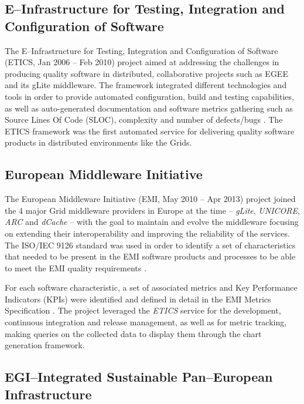 \documentclass[journal]{IEEEtran}
\begin{document}
\subsection{E--Infrastructure for Testing, Integration and Configuration of Software}

The E--Infrastructure for Testing, Integration and Configuration of Software
\cite{cordis:etics, cordis:etics2} (ETICS, Jan 2006 -- Feb 2010) project aimed
at addressing the challenges in producing quality software in distributed,
collaborative projects such as EGEE and its gLite middleware. The framework
integrated different technologies and tools in order to provide automated configuration,
build and testing capabilities, as well as auto-generated documentation and
software metrics gathering such as Source Lines Of Code (SLOC), complexity and
number of defects/bugs \cite{etics}. The ETICS framework was the first automated
service for delivering quality software products in distributed environments like
the Grids.



\subsection{European Middleware Initiative}

The European Middleware Initiative (EMI, May 2010 -- Apr 2013)
\cite{cordis:emi} project joined the 4 major Grid middleware providers in
Europe at the time -- {\sl gLite}, {\sl UNICORE}, {\sl ARC} and {\sl dCache} --
with the goal to maintain and evolve the middleware focusing on extending their
interoperability and improving the reliability of the services. The
ISO/IEC 9126 \cite{iso-9126} standard was used in order to identify a set of
characteristics that needed to be present in the EMI software products and
processes to be able to meet the EMI quality requirements
\cite{emi-quality-model}.

For each software characteristic, a set of associated
metrics and Key Performance Indicators (KPIs) were identified and defined in
detail in the EMI Metrics Specification \cite{emi-metrics}. The project
leveraged the {\sl ETICS} service for the development, continuous integration and release management,
as well as for metric tracking, making queries on the collected data to display
them through the chart generation framework.

\subsection{EGI--Integrated Sustainable Pan--European Infrastructure}
\end{document}
